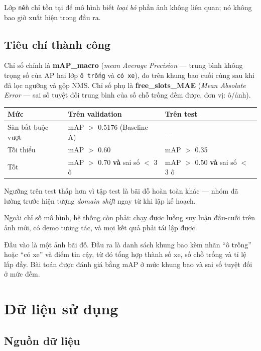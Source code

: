 \documentclass[12pt]{ai_conquer2026}
\begin{document}
Lớp \texttt{nền} chỉ tồn tại để mô hình biết \textit{loại bỏ} phần ảnh không liên quan; nó không bao giờ xuất hiện trong đầu ra.

\subsection{Tiêu chí thành công}

Chỉ số chính là \textbf{mAP\_macro} (\textit{mean Average Precision} --- trung bình không trọng số của AP hai lớp \texttt{ô trống} và \texttt{có xe}), đo trên khung bao cuối cùng sau khi đã lọc ngưỡng và gộp NMS. Chỉ số phụ là \textbf{free\_slots\_MAE} (\textit{Mean Absolute Error} --- sai số tuyệt đối trung bình của số chỗ trống đếm được, đơn vị: ô/ảnh).

\begin{center}
\begin{tabular}{|l|l|l|}
\hline
\textbf{Mức} & \textbf{Trên validation} & \textbf{Trên test} \\
\hline
Sàn bắt buộc vượt & mAP $>$ 0.5176 (Baseline A) & --- \\
\hline
Tối thiểu & mAP $>$ 0.60 & mAP $>$ 0.35 \\
\hline
Tốt & mAP $>$ 0.70 \textbf{và} sai số $<$ 3 ô & mAP $>$ 0.50 \textbf{và} sai số $<$ 3 ô \\
\hline
\end{tabular}
\end{center}

Ngưỡng trên test thấp hơn vì tập test là bãi đỗ hoàn toàn khác --- nhóm đã lường trước hiện tượng \textit{domain shift} ngay từ khi lập kế hoạch.

Ngoài chỉ số mô hình, hệ thống còn phải: chạy được luồng suy luận đầu-cuối trên ảnh mới, có demo tương tác, và mọi kết quả phải tái lập được.

\begin{aivncodebox}
Đầu vào là một ảnh bãi đỗ. Đầu ra là danh sách khung bao kèm nhãn ``ô trống'' hoặc ``có xe'' và điểm tin cậy, từ đó tổng hợp thành số xe, số chỗ trống và tỉ lệ lấp đầy. Bài toán được đánh giá bằng mAP ở mức khung bao và sai số tuyệt đối ở mức đếm.
\end{aivncodebox}

\newpage
\section{Dữ liệu sử dụng}

\subsection{Nguồn dữ liệu}
\end{document}
